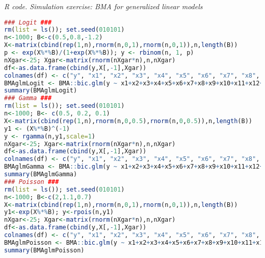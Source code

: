 \begin{tcolorbox}[enhanced,width=4.67in,center upper,
	fontupper=\large\bfseries,drop shadow southwest,sharp corners]
	\textit{R code. Simulation exercise: BMA for generalized linear models}
	\begin{VF}
		\begin{lstlisting}[language=R]
### Logit ###
rm(list = ls()); set.seed(010101)
n<-1000; B<-c(0.5,0.8,-1.2)
X<-matrix(cbind(rep(1,n),rnorm(n,0,1),rnorm(n,0,1)),n,length(B))
p <- exp(X%*%B)/(1+exp(X%*%B)); y <- rbinom(n, 1, p)
nXgar<-25; Xgar<-matrix(rnorm(nXgar*n),n,nXgar)
df<-as.data.frame(cbind(y,X[,-1],Xgar))
colnames(df) <- c("y", "x1", "x2", "x3", "x4", "x5", "x6", "x7", "x8", "x9", "x10", "x11", "x12", "x13", "x14", "x15", "x16", "x17", "x18", "x19", "x20", "x21", "x22", "x23", "x24", "x25", "x26", "x27")
BMAglmLogit <- BMA::bic.glm(y ~ x1+x2+x3+x4+x5+x6+x7+x8+x9+x10+x11+x12+x13+x14+x15+x16+x17+x18+x19+x20+x21+x22+x23+x24+x25+x26+x27, data = df, glm.family = binomial(link="logit"), strict = FALSE, OR = 50)
summary(BMAglmLogit)
### Gamma ###
rm(list = ls()); set.seed(010101)
n<-1000; B<- c(0.5, 0.2, 0.1)
X<-matrix(cbind(rep(1,n),rnorm(n,0,0.5),rnorm(n,0,0.5)),n,length(B))
y1 <- (X%*%B)^(-1)
y <- rgamma(n,y1,scale=1)
nXgar<-25; Xgar<-matrix(rnorm(nXgar*n),n,nXgar)
df<-as.data.frame(cbind(y,X[,-1],Xgar))
colnames(df) <- c("y", "x1", "x2", "x3", "x4", "x5", "x6", "x7", "x8", "x9", "x10", "x11", "x12", "x13", "x14", "x15", "x16", "x17", "x18", "x19", "x20", "x21", "x22", "x23", "x24", "x25", "x26", "x27")
BMAglmGamma <- BMA::bic.glm(y ~ x1+x2+x3+x4+x5+x6+x7+x8+x9+x10+x11+x12+x13+x14+x15+x16+x17+x18+x19+x20+x21+x22+x23+x24+x25+x26+x27, data = df, glm.family = Gamma(link="inverse"), strict = FALSE, OR = 50)
summary(BMAglmGamma)
### Poisson ###
rm(list = ls()); set.seed(010101)
n<-1000; B<-c(2,1.1,0.7)
X<-matrix(cbind(rep(1,n),rnorm(n,0,1),rnorm(n,0,1)),n,length(B))
y1<-exp(X%*%B); y<-rpois(n,y1)
nXgar<-25; Xgar<-matrix(rnorm(nXgar*n),n,nXgar)
df<-as.data.frame(cbind(y,X[,-1],Xgar))
colnames(df) <- c("y", "x1", "x2", "x3", "x4", "x5", "x6", "x7", "x8", "x9", "x10", "x11", "x12", "x13", "x14", "x15", "x16", "x17", "x18", "x19", "x20", "x21", "x22", "x23", "x24", "x25", "x26", "x27")
BMAglmPoisson <- BMA::bic.glm(y ~ x1+x2+x3+x4+x5+x6+x7+x8+x9+x10+x11+x12+x13+x14+x15+x16+x17+x18+x19+x20+x21+x22+x23+x24+x25+x26+x27, data = df, glm.family = poisson(link="log"), strict = FALSE, OR = 50)
summary(BMAglmPoisson)
\end{lstlisting}
	\end{VF}
\end{tcolorbox} 
  
